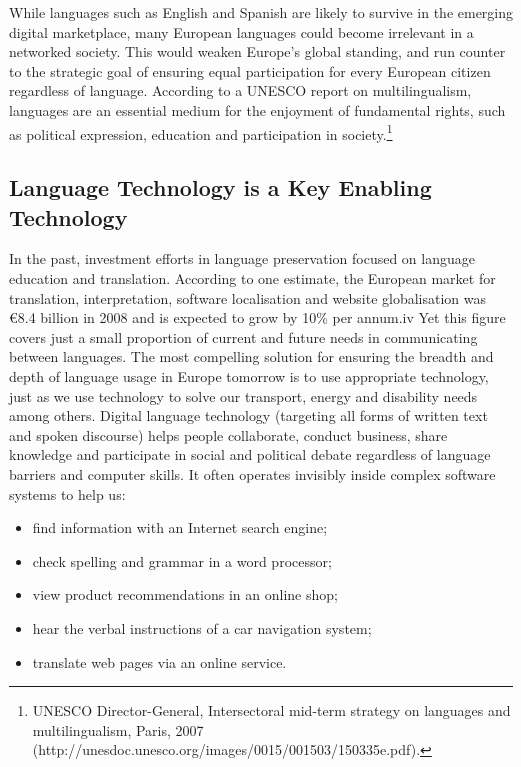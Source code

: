 \documentclass[]{../metanetpaper}
\begin{document}
 While languages such as English and Spanish are likely to survive in the emerging digital marketplace, many European languages could become irrelevant in a networked society. This would weaken Europe’s global standing, and run counter to the strategic goal of ensuring equal participation for every European citizen regardless of language. According to a UNESCO report on multilingualism, languages are an essential medium for the enjoyment of fundamental rights, such as political expression, education and participation in society.\footnote{UNESCO Director-General, Intersectoral mid-term strategy on languages and multilingualism, Paris, 2007 (http://unesdoc.unesco.org/images/0015/001503/150335e.pdf).}

	\subsection{Language Technology is a Key Enabling Technology}
In the past, investment efforts in language preservation focused on language education and translation. According to one estimate, the European market for translation, interpretation, software localisation and website globalisation was €8.4 billion in 2008 and is expected to grow by 10\% per annum.iv Yet this figure covers just a small proportion of current and future needs in communicating between languages.  The most compelling solution for ensuring the breadth and depth of language usage in Europe tomorrow is to use appropriate technology, just as we use technology to solve our transport, energy and disability needs among others. Digital language technology (targeting all forms of written text and spoken discourse) helps people collaborate, conduct business, share knowledge and participate in social and political debate regardless of language barriers and computer skills. It often operates
invisibly inside complex software systems to help us:
\begin{itemize}
\item find information with an Internet search engine;
\item check spelling and grammar in a word processor;
\item view product recommendations in an online shop;
\item hear the verbal instructions of a car navigation system;
\item translate web pages via an online service.
\end{itemize}
\end{document}
